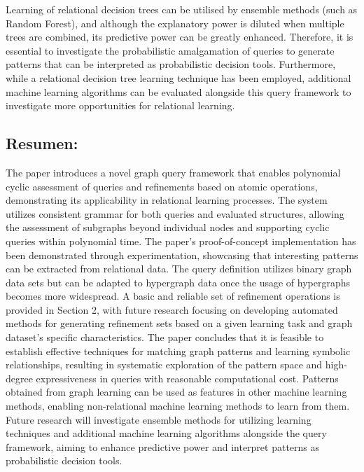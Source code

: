 \documentclass{article}%
\begin{document}
\newline%
Learning of relational decision trees can be utilised by ensemble methods (such as Random Forest), and although the explanatory power is diluted when multiple trees are combined, its predictive power can be greatly enhanced. Therefore, it is essential to investigate the probabilistic amalgamation of queries to generate patterns that can be interpreted as probabilistic decision tools.\newline%
\newline%
Furthermore, while a relational decision tree learning technique has been employed, additional machine learning algorithms can be evaluated alongside this query framework to investigate more opportunities for relational learning.

%
\subsection{Resumen:}%
\label{subsec:Resumen}%
The paper introduces a novel graph query framework that enables polynomial cyclic assessment of queries and refinements based on atomic operations, demonstrating its applicability in relational learning processes. The system utilizes consistent grammar for both queries and evaluated structures, allowing the assessment of subgraphs beyond individual nodes and supporting cyclic queries within polynomial time. The paper's proof{-}of{-}concept implementation has been demonstrated through experimentation, showcasing that interesting patterns can be extracted from relational data.\newline%
\newline%
The query definition utilizes binary graph data sets but can be adapted to hypergraph data once the usage of hypergraphs becomes more widespread. A basic and reliable set of refinement operations is provided in Section 2, with future research focusing on developing automated methods for generating refinement sets based on a given learning task and graph dataset's specific characteristics.\newline%
\newline%
The paper concludes that it is feasible to establish effective techniques for matching graph patterns and learning symbolic relationships, resulting in systematic exploration of the pattern space and high{-}degree expressiveness in queries with reasonable computational cost. Patterns obtained from graph learning can be used as features in other machine learning methods, enabling non{-}relational machine learning methods to learn from them.\newline%
\newline%
Future research will investigate ensemble methods for utilizing learning techniques and additional machine learning algorithms alongside the query framework, aiming to enhance predictive power and interpret patterns as probabilistic decision tools.
\end{document}

